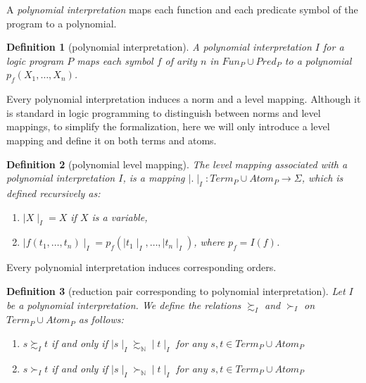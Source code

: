 \documentclass[envcountsame]{tlp}
\newtheorem{definition}{Definition}
\begin{document}
A \emph{polynomial interpretation} maps
each function and each predicate symbol of the program to a polynomial.

















\begin{definition}[polynomial interpretation]
\label{def:interpretation}
A \emph{polynomial interpretation} $\mathit{I}$ for a logic program $P$
maps each 
symbol $f$ of arity $n$ in $\mathit{Fun}_P \cup \mathit{Pred}_P$ to a
polynomial $p_f(X_1,\ldots,X_n)$.
\end{definition}

Every polynomial interpretation induces a norm and a level mapping.
Although it is standard in logic programming to distinguish between norms and level
mappings, to simplify the formalization, here
we will only introduce a level mapping and define it
on both terms and atoms.


\begin{definition}[polynomial level mapping]
\label{def:polynomiallevelmapping}
The \emph{level mapping} associated with a polynomial interpretation $I$, 
is a mapping ${\mid}.{\mid}_{I}: \mathit{Term}_P \cup \mathit{Atom}_P \rightarrow \Sigma$,
which is defined recursively as: 
\begin{enumerate}
    \item[-] ${\mid}X{\mid}_{I} = X$ if $X$ is a variable,
    \item[-] ${\mid}f(t_1,\ldots,t_n){\mid}_{I} =
p_f({\mid}t_{1}{\mid}_{I},\ldots,{\mid}t_{n}{\mid}_{I})$,
where $p_{f} = I(f)$. 
\end{enumerate}
\end{definition}













\noindent
Every polynomial interpretation induces corresponding orders.


\begin{definition}[reduction pair corresponding to polynomial interpretation]\label{def:order-on-atom}
Let $I$ be a polynomial
interpretation. We define the relations $\succsim_I$ and $\succ_I$ on
$\mathit{Term}_P \cup \mathit{Atom}_P$ as follows:
\begin{enumerate}
\item[-] $s \succsim_I t$ if and only if
${\mid}s{\mid}_I \succsim_{\mathbb{N}} {\mid}t{\mid}_I$ for any
$s,t \in \mathit{Term}_P \cup \mathit{Atom}_P$
\item[-] $s \succ_I t$ if and only if
${\mid}s{\mid}_I \succ_{\mathbb{N}} {\mid}t{\mid}_I$ for any
$s,t \in \mathit{Term}_P \cup \mathit{Atom}_P$
\end{enumerate}
\end{definition}
\end{document}
